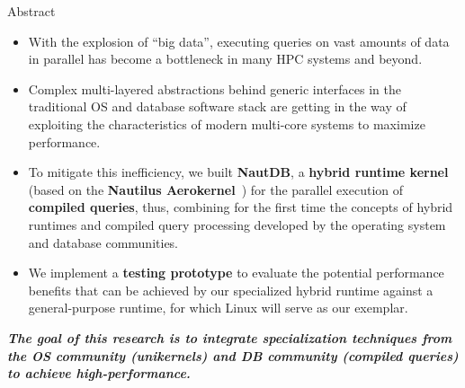 


\begin{block}{Abstract}
  \begin{itemize}
  \item   With the explosion of ``big data'', executing queries on vast amounts of data in parallel has become a bottleneck in many HPC systems and beyond.
  \item   Complex multi-layered abstractions behind generic interfaces in the traditional OS and database software stack are getting in the way of exploiting the characteristics of modern multi-core systems to maximize performance.
  \item   To mitigate this inefficiency, we built \textbf{NautDB}, a \textbf{hybrid runtime kernel} (based on the \textbf{Nautilus Aerokernel}~\cite{HALE:2015:NAUTILUS}) for the parallel execution of \textbf{compiled queries}, thus, combining for the first time the concepts of hybrid runtimes and compiled query processing developed by the operating system and database communities.
  \item   We implement a \textbf{testing prototype} to evaluate the potential performance benefits that can be achieved by our specialized hybrid runtime against a general-purpose runtime, for which Linux will serve as our exemplar.
  \end{itemize}
\begin{mybox}
    \textbf{\emph{The goal of this research is to integrate specialization techniques from the OS community
      (unikernels) and  DB community (compiled queries) to achieve high-performance.}}
\end{mybox}
\end{block}

